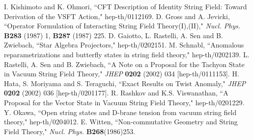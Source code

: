 \documentclass[a4paper,12pt]{article}
\begin{document}
\begin{thebibliography}{999}
I. Kishimoto and K. Ohmori, ``CFT Description of Identity String Field: 
 Toward Derivation of the VSFT Action," hep-th/0112169. 
D. Gross and A. Jevicki, ``Operator Formulation of Interacting 
 String Field Theory(I),(II)," \textit{Nucl. Phys.} 
 \textbf{B283} (1987) 1, \textbf{B287} (1987) 225.
D. Gaiotto, L. Rastelli, A. Sen and B. Zwiebach, ``Star Algebra Projectors," hep-th/0202151. 
M. Schnabl, ``Anomalous reparametrizations and butterfly states in string field theory," 
 hep-th/0202139. 
L. Rastelli, A. Sen and B. Zwiebach, ``A Note on a Proposal for the Tachyon State in 
 Vacuum String Field Theory," \textit{JHEP} \textbf{0202} (2002) 034 [hep-th/0111153]. 
H. Hata, S. Moriyama and S. Teraguchi, ``Exact Results on Twist Anomaly," \textit{JHEP} 
 \textbf{0202} (2002) 036 [hep-th/0201177]. 
R. Rashkov and K.S. Viswanathan, ``A Proposal for the Vector State in Vacuum String 
 Field Theory," hep-th/0201229. 
Y. Okawa, ``Open string states and D-brane tension from vacuum string field theory," 
 hep-th/0204012.
E. Witten, ``Non-commutative Geometry and String Field Theory," 
 \textit{Nucl. Phys.} \textbf{B268}(1986)253.

\end{thebibliography}
\end{document}
